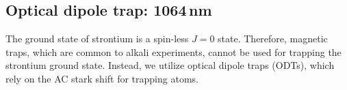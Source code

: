 %
%
%
%
%


\pagebreak
\subsection{Optical dipole trap: 1064\,nm} \label{ssec:1064sys}
\setcounter{footnote}{0}
The ground state of strontium is a spin-less $J=0$ state.
Therefore, magnetic traps, which are common to alkali experiments, cannot be used for trapping the strontium ground state.
Instead, we utilize optical dipole traps (ODTs), which rely on the AC stark shift for trapping atoms.

